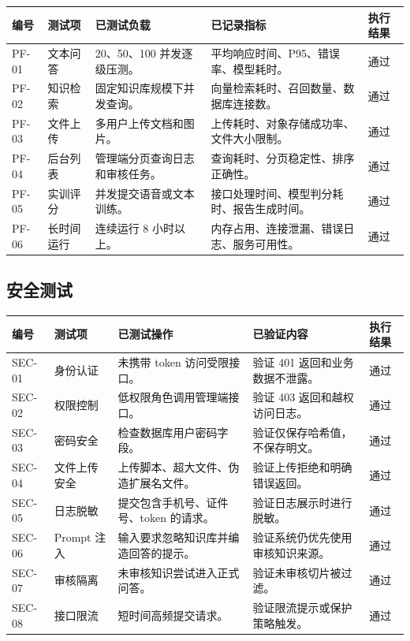 \begin{longtable}{p{1.4cm}p{3.0cm}p{3.6cm}p{4.0cm}p{1.2cm}}
\toprule
编号 & 测试项 & 已测试负载 & 已记录指标 & 执行结果 \\
\midrule
PF-01 & 文本问答 & 20、50、100 并发逐级压测。 & 平均响应时间、P95、错误率、模型耗时。 &通过\\
PF-02 & 知识检索 & 固定知识库规模下并发查询。 & 向量检索耗时、召回数量、数据库连接数。 &通过\\
PF-03 & 文件上传 & 多用户上传文档和图片。 & 上传耗时、对象存储成功率、文件大小限制。 &通过\\
PF-04 & 后台列表 & 管理端分页查询日志和审核任务。 & 查询耗时、分页稳定性、排序正确性。 &通过\\
PF-05 & 实训评分 & 并发提交语音或文本训练。 & 接口处理时间、模型判分耗时、报告生成时间。 &通过\\
PF-06 & 长时间运行 & 连续运行 8 小时以上。 & 内存占用、连接泄漏、错误日志、服务可用性。 &通过\\
\bottomrule
\end{longtable}

\subsection{安全测试}

\begin{longtable}{@{}p{1.2cm}p{2.8cm}p{3.8cm}p{3.5cm}p{1.1cm}@{}}
\toprule
编号 & 测试项 & 已测试操作 & 已验证内容 & 执行结果 \\
\midrule
SEC-01 & 身份认证 & 未携带 token 访问受限接口。 & 验证 401 返回和业务数据不泄露。 &通过\\
SEC-02 & 权限控制 & 低权限角色调用管理端接口。 & 验证 403 返回和越权访问日志。 &通过\\
SEC-03 & 密码安全 & 检查数据库用户密码字段。 & 验证仅保存哈希值，不保存明文。 &通过\\
SEC-04 & 文件上传安全 & 上传脚本、超大文件、伪造扩展名文件。 & 验证上传拒绝和明确错误返回。 &通过\\
SEC-05 & 日志脱敏 & 提交包含手机号、证件号、token 的请求。 & 验证日志展示时进行脱敏。 &通过\\
SEC-06 & Prompt 注入 & 输入要求忽略知识库并编造回答的提示。 & 验证系统仍优先使用审核知识来源。 &通过\\
SEC-07 & 审核隔离 & 未审核知识尝试进入正式问答。 & 验证未审核切片被过滤。 &通过\\
SEC-08 & 接口限流 & 短时间高频提交请求。 & 验证限流提示或保护策略触发。 &通过\\
\bottomrule
\end{longtable}

